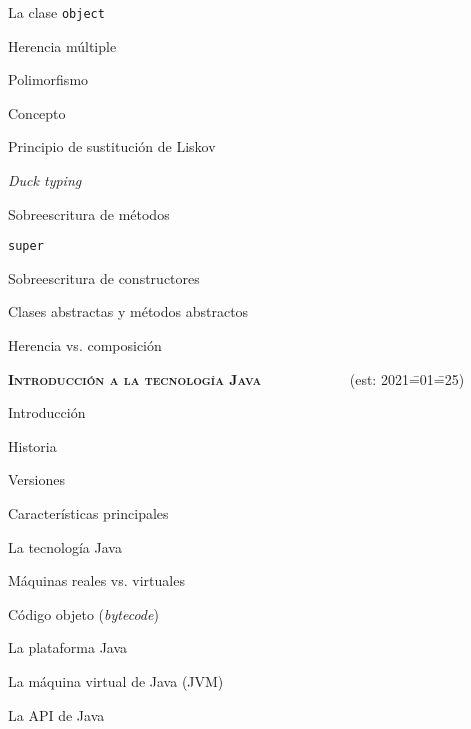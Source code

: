 \begin{longenum}
\begin{longenum}
\begin{longenum}
\begin{longenum}
                \item La clase \texttt{object}
                \item Herencia múltiple
            \end{longenum}
        \end{longenum}
        \item Polimorfismo
        \begin{longenum}
            \item Concepto
            \item Principio de sustitución de Liskov
            \item \textit{Duck typing}
            \item Sobreescritura de métodos
            \item \texttt{super}
            \item Sobreescritura de constructores
            \item Clases abstractas y métodos abstractos
        \end{longenum}
        \item Herencia vs. composición
    \end{longenum}
    \item \textbf{\textsc{Introducción a la tecnología Java}} \ \ \ \ \ \ \ \ \ \ \ \ (est: 2021\==01\==25)
    \begin{longenum}
        \item Introducción
        \begin{longenum}
            \item Historia
            \item Versiones
            \item Características principales
        \end{longenum}
        \item La tecnología Java
        \begin{longenum}
            \item Máquinas reales vs. virtuales
            \item Código objeto (\textit{bytecode})
            \item La plataforma Java
            \begin{longenum}
                \item La máquina virtual de Java (JVM)
                \item La API de Java
            \end{longenum}

\end{longenum}
\end{longenum}
\end{longenum}
